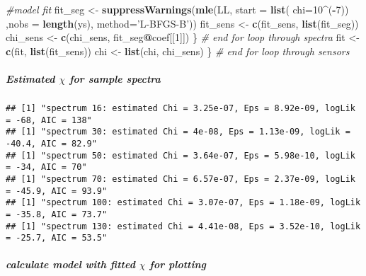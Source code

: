 \documentclass[]{article}
\newenvironment{Shaded}{\begin{snugshade}}{\end{snugshade}}
\newcommand{\KeywordTok}[1]{\textcolor[rgb]{0.13,0.29,0.53}{\textbf{#1}}}
\newcommand{\DataTypeTok}[1]{\textcolor[rgb]{0.13,0.29,0.53}{#1}}
\newcommand{\DecValTok}[1]{\textcolor[rgb]{0.00,0.00,0.81}{#1}}
\newcommand{\StringTok}[1]{\textcolor[rgb]{0.31,0.60,0.02}{#1}}
\newcommand{\CommentTok}[1]{\textcolor[rgb]{0.56,0.35,0.01}{\textit{#1}}}
\newcommand{\OperatorTok}[1]{\textcolor[rgb]{0.81,0.36,0.00}{\textbf{#1}}}
\newcommand{\NormalTok}[1]{#1}
\let\oldsubparagraph\subparagraph
\renewcommand{\subparagraph}[1]{\oldsubparagraph{#1}\mbox{}}
\begin{document}
\begin{Shaded}
\begin{Highlighting}[]
    \CommentTok{#model fit}
\NormalTok{    fit_seg <-}\StringTok{ }\KeywordTok{suppressWarnings}\NormalTok{(}\KeywordTok{mle}\NormalTok{(LL, }\DataTypeTok{start =} \KeywordTok{list}\NormalTok{( }\DataTypeTok{chi=}\DecValTok{10}\OperatorTok{^}\NormalTok{(}\OperatorTok{-}\DecValTok{7}\NormalTok{))}
\NormalTok{                              ,}\DataTypeTok{nobs =} \KeywordTok{length}\NormalTok{(ys),  }\DataTypeTok{method=}\StringTok{'L-BFGS-B'}\NormalTok{))}
\NormalTok{    fit_sens <-}\StringTok{ }\KeywordTok{c}\NormalTok{(fit_sens, }\KeywordTok{list}\NormalTok{(fit_seg))}
\NormalTok{    chi_sens <-}\StringTok{ }\KeywordTok{c}\NormalTok{(chi_sens, fit_seg}\OperatorTok{@}\NormalTok{coef[[}\DecValTok{1}\NormalTok{]])}
\NormalTok{  \} }\CommentTok{# end for loop through spectra}
\NormalTok{  fit <-}\StringTok{ }\KeywordTok{c}\NormalTok{(fit, }\KeywordTok{list}\NormalTok{(fit_sens))}
\NormalTok{  chi <-}\StringTok{ }\KeywordTok{list}\NormalTok{(chi, chi_sens)}
\NormalTok{\} }\CommentTok{# end for loop through sensors}
\end{Highlighting}
\end{Shaded}

\subparagraph{\texorpdfstring{Estimated \(\chi\) for sample
spectra}{Estimated \textbackslash{}chi for sample spectra}}\label{estimated-chi-for-sample-spectra}

\begin{verbatim}
## [1] "spectrum 16: estimated Chi = 3.25e-07, Eps = 8.92e-09, logLik = -68, AIC = 138"
## [1] "spectrum 30: estimated Chi = 4e-08, Eps = 1.13e-09, logLik = -40.4, AIC = 82.9"
## [1] "spectrum 50: estimated Chi = 3.64e-07, Eps = 5.98e-10, logLik = -34, AIC = 70"
## [1] "spectrum 70: estimated Chi = 6.57e-07, Eps = 2.37e-09, logLik = -45.9, AIC = 93.9"
## [1] "spectrum 100: estimated Chi = 3.07e-07, Eps = 1.18e-09, logLik = -35.8, AIC = 73.7"
## [1] "spectrum 130: estimated Chi = 4.41e-08, Eps = 3.52e-10, logLik = -25.7, AIC = 53.5"
\end{verbatim}

\subparagraph{\texorpdfstring{calculate model with fitted \(\chi\) for
plotting}{calculate model with fitted \textbackslash{}chi for plotting}}\label{calculate-model-with-fitted-chi-for-plotting}
\end{document}
